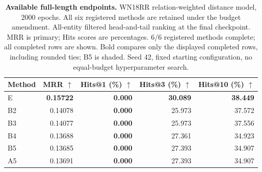 \begin{table}[!htbp]
\centering
\caption{\textbf{Available full-length endpoints.} WN18RR relation-weighted distance model, 2000 epochs. All six registered methods are retained under the budget amendment. All-entity filtered head-and-tail ranking at the final checkpoint. MRR is primary; Hits scores are percentages. 6/6 registered methods complete; all completed rows are shown. Bold compares only the displayed completed rows, including rounded ties; B5 is shaded. Seed 42, fixed starting configuration, no equal-budget hyperparameter search.}
\label{tab:revision-kg-distance-audit}
\footnotesize\setlength{\tabcolsep}{5pt}\renewcommand{\arraystretch}{1.12}
\begin{tabular}{lrrrr}
\toprule
Method & MRR $\uparrow$ & Hits@1 (\%) $\uparrow$ & Hits@3 (\%) $\uparrow$ & Hits@10 (\%) $\uparrow$ \\
\midrule
E & \textbf{0.15722} & \textbf{0.000} & \textbf{30.089} & \textbf{38.449} \\
B2 & 0.14078 & \textbf{0.000} & 25.973 & 37.572 \\
B3 & 0.14077 & \textbf{0.000} & 25.973 & 37.556 \\
B4 & 0.13688 & \textbf{0.000} & 27.361 & 34.923 \\
\rowcolor{oursbg}
B5 & 0.13685 & \textbf{0.000} & 27.393 & 34.907 \\
A5 & 0.13691 & \textbf{0.000} & 27.393 & 34.907 \\
\bottomrule
\end{tabular}
\end{table}
